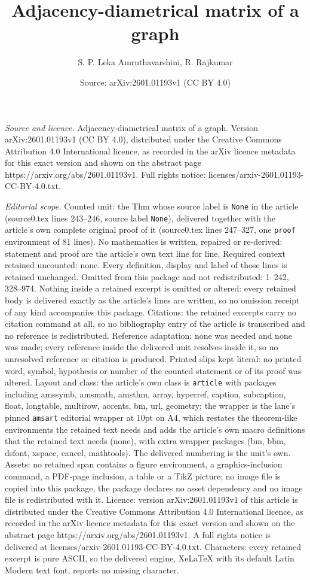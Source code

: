 \documentclass[10pt,a4paper]{amsart}
\title[Adjacency-diametrical matrix of a graph]{Adjacency-diametrical matrix of a graph}
\author{S. P. Leka Amruthavarshini, R. Rajkumar}
\date{Source: arXiv:2601.01193v1 (CC BY 4.0)}
\begin{document}
\maketitle

\noindent\emph{Source and licence.} Adjacency-diametrical matrix of a graph. Version arXiv:2601.01193v1 (CC BY 4.0), distributed under the Creative Commons Attribution 4.0 International licence, as recorded in the arXiv licence metadata for this exact version and shown on the abstract page https://arxiv.org/abs/2601.01193v1. Full rights notice: licenses/arxiv-2601.01193-CC-BY-4.0.txt.\par\smallskip

\noindent\textit{Editorial scope.} Counted unit: the Thm whose source label is \texttt{None} in the article (source0.tex lines 243--246, source label \texttt{None}), delivered together with the article's own complete original proof of it (source0.tex lines 247--327, one \texttt{proof} environment of 81 lines). No mathematics is written, repaired or re-derived: statement and proof are the article's own text line for line. Required context retained uncounted: none. Every definition, display and label of those lines is retained unchanged. Omitted from this package and not redistributed: 1--242, 328--974. Nothing inside a retained excerpt is omitted or altered: every retained body is delivered exactly as the article's lines are written, so no omission receipt of any kind accompanies this package. Citations: the retained excerpts carry no citation command at all, so no bibliography entry of the article is transcribed and no reference is redistributed. Reference adaptation: none was needed and none was made; every reference inside the delivered unit resolves inside it, so no unresolved reference or citation is produced. Printed slips kept literal: no printed word, symbol, hypothesis or number of the counted statement or of its proof was altered. Layout and class: the article's own class is \texttt{article} with packages including amssymb, amsmath, amsthm, array, hyperref, caption, subcaption, float, longtable, multirow, accents, bm, url, geometry; the wrapper is the lane's pinned \texttt{amsart} editorial wrapper at 10pt on A4, which restates the theorem-like environments the retained text needs and adds the article's own macro definitions that the retained text needs (none), with extra wrapper packages (bm, bbm, dsfont, xspace, cancel, mathtools). The delivered numbering is the unit's own. Assets: no retained span contains a figure environment, a graphics-inclusion command, a PDF-page inclusion, a table or a TikZ picture; no image file is copied into this package, the package declares no asset dependency and no image file is redistributed with it. Licence: version arXiv:2601.01193v1 of this article is distributed under the Creative Commons Attribution 4.0 International licence, as recorded in the arXiv licence metadata for this exact version and shown on the abstract page https://arxiv.org/abs/2601.01193v1. A full rights notice is delivered at licenses/arxiv-2601.01193-CC-BY-4.0.txt. Characters: every retained excerpt is pure ASCII, so the delivered engine, XeLaTeX with its default Latin Modern text font, reports no missing character.
\end{document}
